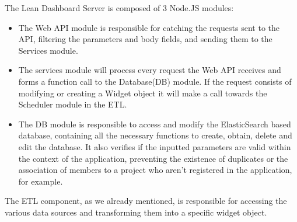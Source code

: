 \documentclass[a4paper,twoside,10pt]{report}
\begin{document}
The Lean Dashboard Server is composed of 3 Node.JS\cite{NODE} modules:
\begin{itemize}
  \item The Web API module is responsible for catching the requests sent to the API, filtering the parameters and body fields, and sending them to the Services module.
  \item The services module will process every request the Web API receives and forms a function call to the Database(DB) module. If the request consists of modifying or creating a Widget object it will make a call towards the Scheduler module in the ETL.
  \item The DB module is responsible to access and modify the ElasticSearch based database, containing all the necessary functions to create, obtain, delete and edit the database. It also verifies if the inputted parameters are valid within the context of the application, preventing the existence of duplicates or the association of members to a project who aren't registered in the application, for example.
\end{itemize}
The ETL component, as we already mentioned, is responsible for accessing the various data sources and transforming them into a specific widget object.
\end{document}
